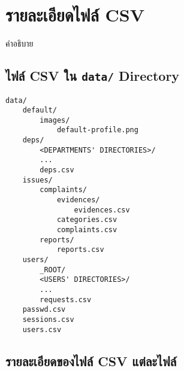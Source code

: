 \section{รายละเอียดไฟล์ CSV}

คำอธิบาย

\subsection{ไฟล์ CSV ใน \texttt{data\slash} Directory}

\begin{lstlisting}
data/
    default/
        images/
            default-profile.png
    deps/
        <DEPARTMENTS' DIRECTORIES>/
        ...
        deps.csv
    issues/
        complaints/
            evidences/
                evidences.csv
            categories.csv
            complaints.csv
        reports/
            reports.csv
    users/
        _ROOT/
        <USERS' DIRECTORIES>/
        ...
        requests.csv
    passwd.csv
    sessions.csv
    users.csv
\end{lstlisting}

\subsection{รายละเอียดของไฟล์ CSV แต่ละไฟล์}
\noindent\blindtext[3]
